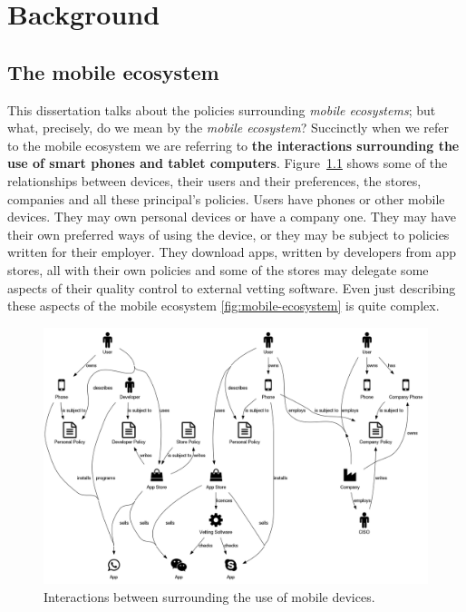 \documentclass[thesis.tex]{subfiles}
\begin{document}
\chapter{Background}

\section{The mobile ecosystem}\label{sec:mobile-ecosystem}

This dissertation talks about the policies surrounding \emph{mobile
ecosystems}; but what, precisely, do we mean by the \emph{mobile
ecosystem}?  Succinctly when we refer to the mobile ecosystem we are
referring to \textbf{the interactions surrounding the use of smart
phones and tablet computers}.  Figure~\ref{fig:mobile-ecosystem} shows
some of the relationships between devices, their users and their
preferences, the stores, companies and all these principal's
policies. Users have phones or other mobile devices.  They may own
personal devices or have a company one.  They may have their own
preferred ways of using the device, or they may be subject to policies
written for their employer.  They download apps, written by developers
from app stores, all with their own policies and some of the stores
may delegate some aspects of their quality control to external vetting
software.  Even just describing these aspects of the mobile ecosystem
\autoref{fig:mobile-ecosystem} is quite complex.

\begin{figure}
  \centering
  \includegraphics[width=\linewidth]{figures/mobile-ecosystem.png}
  \caption{Interactions between surrounding the use of mobile devices.}
  \label{fig:mobile-ecosystem}
\end{figure}
\end{document}
